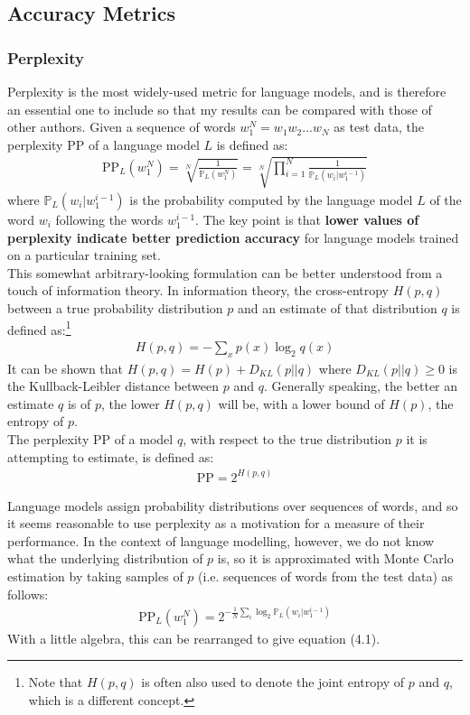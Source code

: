 \documentclass[a4paper, 12pt]{report}
\newcommand{\tbf}[1]{\textbf{#1}}
\begin{document}
\subsection{Accuracy Metrics}

\subsubsection*{Perplexity}

Perplexity is the most widely-used metric for language models, and is therefore an essential one to include so that my results can be compared with those of other authors. Given a sequence of words $w_1^{N} = w_1w_2...w_N$ as test data, the perplexity PP of a language model $L$ is defined as:
\begin{gather}
	\text{PP}_L(w_1^N) = \sqrt[N]{\frac{1}{\mathbb{P}_L(w_1^N)}} = \sqrt[N]{\prod_{i=1}^{N}\frac{1}{\mathbb{P}_L(w_i | w_1^{i-1})}}
\end{gather}
where $\mathbb{P}_L(w_i | w_1^{i-1})$ is the probability computed by the language model $L$ of the word $w_i$ following the words $w_1^{i-1}$. The key point is that \tbf{lower values of perplexity indicate better prediction accuracy} for language models trained on a particular training set. \\

This somewhat arbitrary-looking formulation can be better understood from a touch of information theory. In information theory, the cross-entropy $H(p, q)$ between a true probability distribution $p$ and an estimate of that distribution $q$ is defined as:\footnote{Note that $H(p, q)$ is often also used to denote the joint entropy of $p$ and $q$, which is a different concept.}
\begin{gather*}
	H(p, q) = -\sum_x p(x) \log_2 q(x)
\end{gather*}
It can be shown that $H(p, q) = H(p) + D_{KL}(p || q)$ where $D_{KL}(p || q) \geq 0$ is the Kullback-Leibler distance between $p$ and $q$. Generally speaking, the better an estimate $q$ is of $p$, the lower $H(p, q)$ will be, with a lower bound of $H(p)$, the entropy of $p$. \\

The perplexity PP of a model $q$, with respect to the true distribution $p$ it is attempting to estimate, is defined as:
\begin{gather*}
	\text{PP} = 2^{H(p, q)}
\end{gather*}

Language models assign probability distributions over sequences of words, and so it seems reasonable to use perplexity as a motivation for a measure of their performance. In the context of language modelling, however, we do not know what the underlying distribution of $p$ is, so it is approximated with Monte Carlo estimation by taking samples of $p$ (i.e. sequences of words from the test data) as follows:
\begin{gather*}
	\text{PP}_L(w_1^N) = 2^{-\frac{1}{N}\sum_i \log_2 \mathbb{P}_L(w_i | w_1^{i-1})}
\end{gather*}
With a little algebra, this can be rearranged to give equation (4.1). \\
\end{document}
